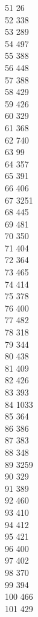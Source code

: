 { 51	26 \\
 52	338 \\
 53	289 \\
 54	497 \\
 55	388 \\
 56	448 \\
 57	388 \\
 58	429 \\
 59	426 \\
 60	329 \\
 61	368 \\
 62	740 \\
 63	99 \\
 64	357 \\
 65	391 \\
 66	406 \\
 67	3251 \\
 68	445 \\
 69	481 \\
 70	350 \\
 71	404 \\
 72	364 \\
 73	465 \\
 74	414 \\
 75	378 \\
 76	400 \\
 77	482 \\
 78	318 \\
 79	344 \\
 80	438 \\
 81	409 \\
 82	426 \\
 83	393 \\
 84	1033 \\
 85	364 \\
 86	386 \\
 87	383 \\
 88	348 \\
 89	3259 \\
 90	329 \\
 91	389 \\
 92	460 \\
 93	410 \\
 94	412 \\
 95	421 \\
 96	400 \\
 97	402 \\
 98	370 \\
 99	394 \\
 100	466 \\
 101	429 \\
}

